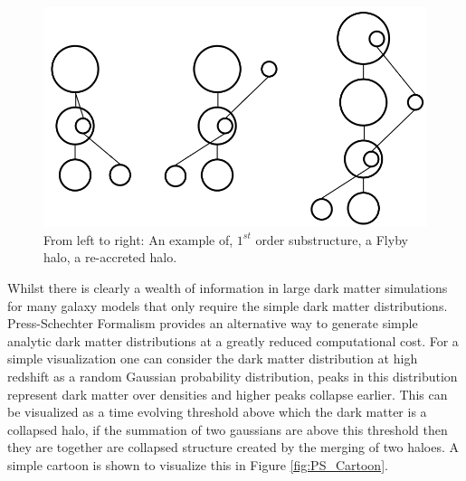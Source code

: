 \begin{figure}[h]
	\centering
	\includegraphics[width = \linewidth]{Figures/Chapter1/Substructures.png}
    \caption{From left to right: An example of, $1^{st}$ order substructure, a Flyby halo, a re-accreted halo.}
	\label{fig:Substructures}
\end{figure}

Whilst there is clearly a wealth of information in large dark matter simulations for many galaxy models that only require the simple dark matter distributions. Press-Schechter Formalism \citep{Press1974} provides an alternative way to generate simple analytic dark matter distributions at a greatly reduced computational cost. For a simple visualization one can consider the dark matter distribution at high redshift as a random Gaussian probability distribution, peaks in this distribution represent dark matter over densities and higher peaks collapse earlier. This can be visualized as a time evolving threshold above which the dark matter is a collapsed halo, if the summation of two gaussians are above this threshold then they are together are collapsed structure created by the merging of two haloes. A simple cartoon is shown to visualize this in Figure \ref{fig:PS_Cartoon}.

